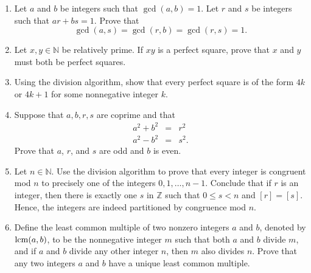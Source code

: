 {\begin{enumerate}
\begin{enumerate}
 \item
Prove that $f_n < 2^n$.
 
 \item
Prove that $f_{n + 1} f_{n - 1} = f^2_n + (-1)^n$, $n \geq 2$.
 
 \item
Prove that $f_n = [(1 + \sqrt{5}\, )^n - (1 - \sqrt{5}\, )^n]/ 2^n \sqrt{5}$.
 
 \item
Show that $\lim_{n \rightarrow \infty} f_n / f_{n + 1} = (\sqrt{5} - 1)/2$. 
 
 \item
Prove that $f_n$ and $f_{n + 1}$ are relatively prime.
 
\end{enumerate}

\item
Let $a$ and $b$ be integers such that $\gcd(a,b) = 1$.  Let $r$ and $s$ be integers such that $ar + bs =1$.  Prove that 
$$
\gcd(a,s) = \gcd(r,b) = \gcd(r,s) =  1.
$$

\item
Let $x, y \in {\mathbb N}$ be relatively prime.  If $xy$ is a perfect square, prove that $x$ and $y$ must both be perfect squares.

\item
Using the division algorithm, show that every perfect square is of the form $4k$ or $4k + 1$ for some nonnegative integer $k$.

\item
Suppose that $a, b, r, s$ are coprime and that
\begin{eqnarray*}
a^2 + b^2 &=& r^2 \\
a^2 - b^2 &=& s^2.
\end{eqnarray*}
Prove that $a$, $r$, and $s$ are odd and $b$ is even.
 
\item
Let $n \in {\mathbb N}$.  Use the division algorithm to prove that every integer is congruent mod $n$ to precisely one of the integers $0, 1, \ldots, n-1$.  Conclude that if $r$ is an integer, then there is exactly one $s$ in ${\mathbb Z}$ such that $0 \leq s < n$ and $[r] = [s]$.   Hence, the integers are indeed partitioned by congruence mod $n$. 

\item
Define the {\bfi least common multiple\/} of two nonzero integers $a$ and $b$, denoted by $\operatorname{lcm}(a,b)$\label{leastcm}, to be the nonnegative integer $m$ such that both $a$ and $b$ divide $m$, and if $a$ and $b$  divide any other integer $n$, then $m$ also divides $n$.  Prove that any two integers $a$ and $b$ have a unique least common multiple. 


\end{enumerate}}
